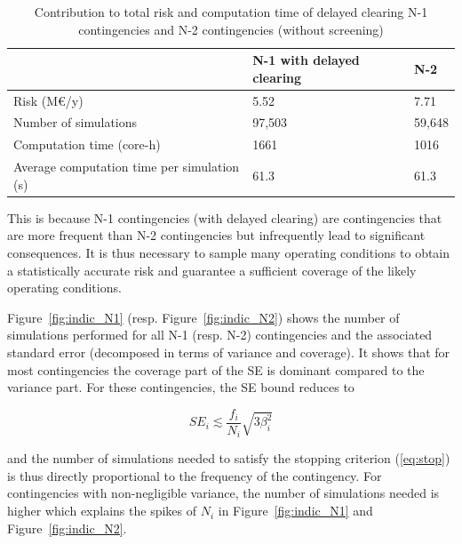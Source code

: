 \begin{table}
\centering
\caption{Contribution to total risk and computation time of delayed clearing N-1 contingencies and N-2 contingencies (without screening)}
\label{tab:summary-N1N2}
\begin{tabular}{@{}lll@{}}
\toprule
                                 & N-1 with delayed clearing  & N-2 \\ \midrule
Risk (M€/y) & 5.52 & 7.71 \\
Number of simulations            & 97,503 & 59,648 \\
Computation time (core-h)        & 1661  & 1016 \\
Average computation time per simulation (s) & 61.3 & 61.3 \\ \bottomrule
\end{tabular}
\end{table}


This is because N-1 contingencies (with delayed clearing) are contingencies that are more frequent than N-2 contingencies but infrequently lead to significant consequences. It is thus necessary to sample many operating conditions to obtain a statistically accurate risk and guarantee a sufficient coverage of the likely operating conditions.

Figure~\ref{fig:indic_N1} (resp. Figure~\ref{fig:indic_N2}) shows the number of simulations performed for all N-1 (resp. N-2) contingencies and the associated standard error (decomposed in terms of variance and coverage). It shows that for most contingencies the coverage part of the SE is dominant compared to the variance part. For these contingencies, the SE bound reduces to

\begin{equation}
  SE_i \lesssim \frac{f_i}{N_i} \sqrt{3 \beta_i^2}
\end{equation}

\noindent and the number of simulations needed to satisfy the stopping criterion (\ref{eq:stop}) is thus directly proportional to the frequency of the contingency. For contingencies with non-negligible variance, the number of simulations needed is higher which explains the spikes of \(N_i\) in Figure~\ref{fig:indic_N1} and Figure~\ref{fig:indic_N2}.


